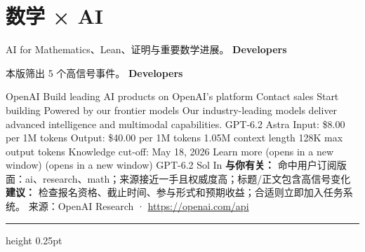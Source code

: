\documentclass[10.5pt]{ctexart}
\begin{document}
\section*{数学 × AI}
{\color{ormuted} AI for Mathematics、Lean、证明与重要数学进展。}
\vspace{2mm}
{\LARGE\bfseries Developers}\par
\vspace{1mm}
{\color{ormuted} 本版筛出 5 个高信号事件。}
\vspace{3mm}
{\Large\bfseries Developers}\par
OpenAI Build leading AI products on OpenAI’s platform Contact sales Start building Powered by our frontier models Our industry-leading models deliver advanced intelligence and multimodal capabilities. GPT-6.2 Astra Input: \$8.00 per 1M tokens Output: \$40.00 per 1M tokens 1.05M context length 128K max output tokens Knowledge cut-off: May 18, 2026 Learn more (opens in a new window) (opens in a new window) GPT-6.2 Sol In
\textbf{与你有关：} 命中用户订阅版面：ai、research、math；来源接近一手且权威度高；标题/正文包含高信号变化
\textbf{建议：} 检查报名资格、截止时间、参与形式和预期收益；合适则立即加入任务系统。
{\footnotesize\color{ormuted} 来源：OpenAI Research · \url{https://openai.com/api}}
\vspace{4mm}
\hrule height 0.25pt
\vspace{3mm}
\end{document}
